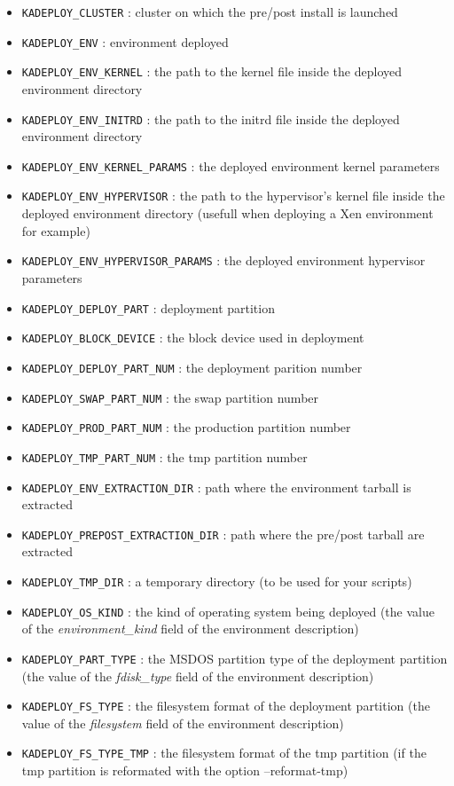 \documentclass[a4wide,10pt,oneside]{book}
\begin{document}
\begin{itemize}
\item \texttt{KADEPLOY\_CLUSTER} : cluster on which the pre/post install is launched
\item \texttt{KADEPLOY\_ENV} : environment deployed
\item \texttt{KADEPLOY\_ENV\_KERNEL} : the path to the kernel file inside the deployed environment directory
\item \texttt{KADEPLOY\_ENV\_INITRD} : the path to the initrd file inside the deployed environment directory
\item \texttt{KADEPLOY\_ENV\_KERNEL\_PARAMS} : the deployed environment kernel parameters
\item \texttt{KADEPLOY\_ENV\_HYPERVISOR} : the path to the hypervisor's kernel file inside the deployed environment directory (usefull when deploying a Xen environment for example)
\item \texttt{KADEPLOY\_ENV\_HYPERVISOR\_PARAMS} : the deployed environment hypervisor parameters
\item \texttt{KADEPLOY\_DEPLOY\_PART} : deployment partition
\item \texttt{KADEPLOY\_BLOCK\_DEVICE} : the block device used in deployment
\item \texttt{KADEPLOY\_DEPLOY\_PART\_NUM} : the deployment parition number
\item \texttt{KADEPLOY\_SWAP\_PART\_NUM} : the swap partition number
\item \texttt{KADEPLOY\_PROD\_PART\_NUM} : the production partition number
\item \texttt{KADEPLOY\_TMP\_PART\_NUM} : the tmp partition number
\item \texttt{KADEPLOY\_ENV\_EXTRACTION\_DIR} : path where the environment tarball is extracted
\item \texttt{KADEPLOY\_PREPOST\_EXTRACTION\_DIR} : path where the pre/post tarball are extracted
\item \texttt{KADEPLOY\_TMP\_DIR} : a temporary directory (to be used for your scripts)
\item \texttt{KADEPLOY\_OS\_KIND} : the kind of operating system being deployed (the value of the \emph{environment\_kind} field of the environment description)
\item \texttt{KADEPLOY\_PART\_TYPE} : the MSDOS partition type of the deployment partition (the value of the \emph{fdisk\_type} field of the environment description)
\item \texttt{KADEPLOY\_FS\_TYPE} : the filesystem format of the deployment partition (the value of the \emph{filesystem} field of the environment description)
\item \texttt{KADEPLOY\_FS\_TYPE\_TMP} : the filesystem format of the tmp partition (if the tmp partition is reformated with the option --reformat-tmp)
\end{itemize}
\end{document}
